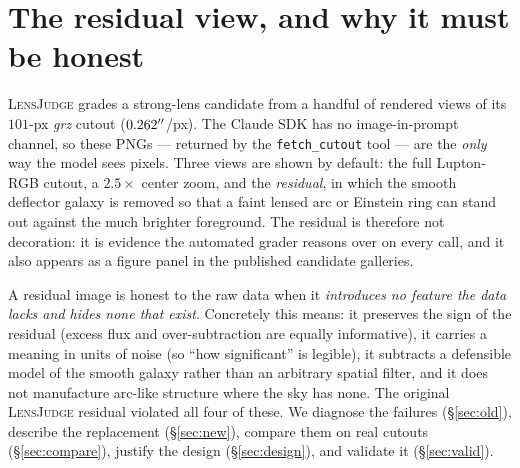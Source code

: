 \documentclass[11pt,letterpaper]{article}
\newcommand{\lj}{\textsc{LensJudge}}
\begin{document}
\begin{abstract}
PSF-circularization residual confined to the inner $\sim$2\arcsec, shown faithfully as a blue core rather than
hidden. A controlled grading A/B on $525$ candidates then measured the downstream effect: the new residual is
\emph{discrimination-neutral} (lens-vs-random $\Delta\mathrm{AUC}=+0.021$, $95\%$ CI $[-0.04,+0.09]$); it exposed
and let us fix a real regression in the grader's residual \emph{convention} (an early ``blue $=$ artifact'' wording
made the grader reject real, blue arcs); and because the new image makes the grader score $\sim$$2\times$ hotter, it
must be deployed through an operating-point calibration, not its raw grade. The gain is integrity and defensibility,
not grading accuracy.
\end{abstract}

\section{The residual view, and why it must be honest}
\lj{} grades a strong-lens candidate from a handful of rendered views of its $101$-px \emph{grz} cutout
($0.262^{\prime\prime}$/px). The Claude SDK has no image-in-prompt channel, so these PNGs --- returned by the
\texttt{fetch\_cutout} tool --- are the \emph{only} way the model sees pixels. Three views are shown by default:
the full Lupton-RGB cutout, a $2.5\times$ center zoom, and the \emph{residual}, in which the smooth deflector
galaxy is removed so that a faint lensed arc or Einstein ring can stand out against the much brighter foreground.
The residual is therefore not decoration: it is evidence the automated grader reasons over on every call, and it
also appears as a figure panel in the published candidate galleries.

A residual image is honest to the raw data when it \emph{introduces no feature the data lacks and hides none that
exist}. Concretely this means: it preserves the sign of the residual (excess flux and over-subtraction are
equally informative), it carries a meaning in units of noise (so ``how significant'' is legible), it subtracts a
defensible model of the smooth galaxy rather than an arbitrary spatial filter, and it does not manufacture
arc-like structure where the sky has none. The original \lj{} residual violated all four of these. We diagnose
the failures (\S\ref{sec:old}), describe the replacement (\S\ref{sec:new}), compare them on real cutouts
(\S\ref{sec:compare}), justify the design (\S\ref{sec:design}), and validate it (\S\ref{sec:valid}).
\end{document}

